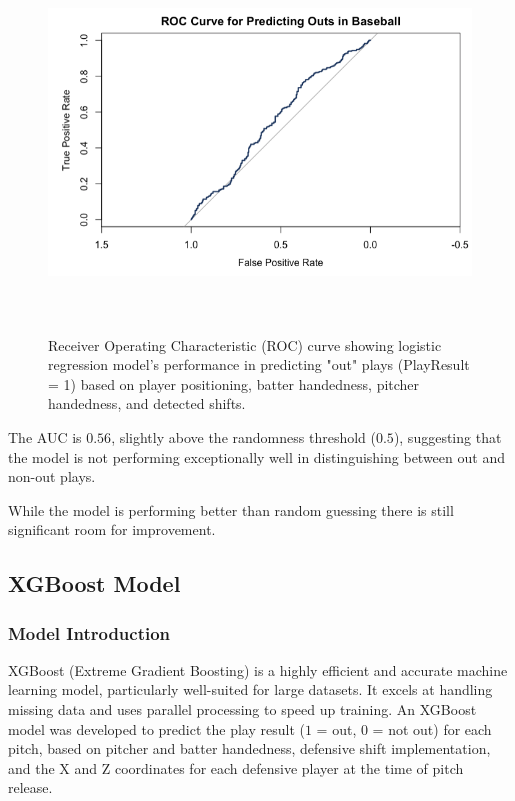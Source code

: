 \documentclass{article}
\begin{document}
\begin{figure}[h]
    \centering
    \includegraphics[height=10cm]{images/roc_lr.png}
    \caption{Receiver Operating Characteristic (ROC) curve showing logistic regression model's performance in predicting "out" plays (PlayResult = 1) based on player positioning, batter handedness, pitcher handedness, and detected shifts.}
\end{figure}

The AUC is $0.56$, slightly above the randomness threshold ($0.5$), suggesting that the model is not performing exceptionally well in distinguishing between out and non-out plays.

While the model is performing better than random guessing there is still significant room for improvement. 

\subsection{XGBoost Model}
\subsubsection{Model Introduction}
XGBoost (Extreme Gradient Boosting) is a highly efficient and accurate machine learning model, particularly well-suited for large datasets. It excels at handling missing data and uses parallel processing to speed up training. An XGBoost model was developed to predict the play result ($1$ = out, $0$ = not out) for each pitch, based on pitcher and batter handedness, defensive shift implementation, and the X and Z coordinates for each defensive player at the time of pitch release.
\end{document}
